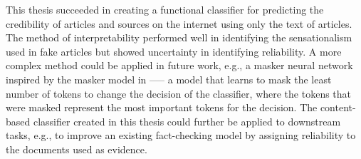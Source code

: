 This thesis succeeded in creating a functional classifier for predicting the credibility of articles and sources on the internet using only the text of articles. The method of interpretability performed well in identifying the sensationalism used in fake articles but showed uncertainty in identifying reliability. A more complex method could be applied in future work, e.g., a masker neural network inspired by the masker model in \cite{claim-dissector} —-- a model that learns to mask the least number of tokens to change the decision of the classifier, where the tokens that were masked represent the most important tokens for the decision. The content-based classifier created in this thesis could further be applied to downstream tasks, e.g., to improve an existing fact-checking model by assigning reliability to the documents used as evidence.